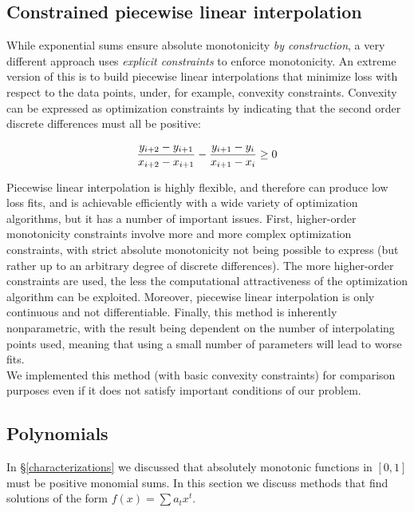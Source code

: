 \documentclass[12pt,a4paper]{article}
\begin{document}
\subsection{Constrained piecewise linear interpolation}
\label{piecewise_interpolation}

While exponential sums ensure absolute monotonicity {\emph{by construction}}, a very different approach uses {\emph{explicit constraints}} to enforce monotonicity. An extreme version of this is to build piecewise linear interpolations that minimize loss with respect to the data points, under, for example, convexity constraints. Convexity can be expressed as optimization constraints by indicating that the second order discrete differences must all be positive:

\begin{equation}
{{y_{i+2} - y_{i+1}} \over {x_{i+2} - x_{i+1}}} - {{y_{i+1} - y_{i}} \over {x_{i+1} - x_{i}}} \geq 0
\end{equation}

Piecewise linear interpolation is highly flexible, and therefore can produce low loss fits, and is achievable efficiently with a wide variety of optimization algorithms, but it has a number of important issues. First, higher-order monotonicity constraints involve more and more complex optimization constraints, with strict absolute monotonicity not being possible to express (but rather up to an arbitrary degree of discrete differences). The more higher-order constraints are used, the less the computational attractiveness of the optimization algorithm can be exploited. Moreover, piecewise linear interpolation is only continuous and not differentiable. Finally, this method is inherently nonparametric, with the result being dependent on the number of interpolating points used, meaning that using a small number of parameters will lead to worse fits.\\

We implemented this method (with basic convexity constraints) for comparison purposes even if it does not satisfy important conditions of our problem.

\subsection{Polynomials}
\label{polynomials}

In \S \ref{characterizations} we discussed that absolutely monotonic functions in $[0,1]$ must be positive monomial sums. In this section we discuss methods that find solutions of the form $f(x) = \sum a_t x^t$.\\
\end{document}
